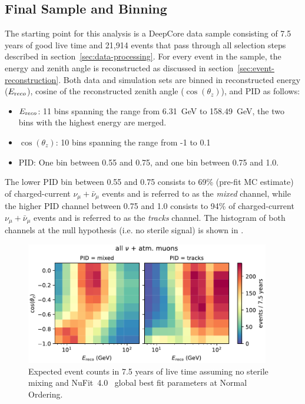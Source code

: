 \subsection{Final Sample and Binning}
\label{sec:sample-binning}
The starting point for this analysis is a DeepCore data sample consisting of 7.5 years of good live time and 21,914 events that pass through all selection steps described in section~\ref{sec:data-processing}. For every event in the sample, the energy and zenith angle is reconstructed as discussed in section~\ref{sec:event-reconstruction}. Both data and simulation sets are binned in reconstructed energy ($E_{\rm reco}$), cosine of the reconstructed zenith angle ($\cos(\theta_z)$), and PID as follows:

\begin{itemize}
    \item $E_{\rm reco}$: 11 bins spanning the range from 6.31~GeV to 158.49~GeV, the two bins with the highest energy are merged.
    \item $\cos(\theta_z)$: 10 bins spanning the range from -1 to 0.1
    \item PID: One bin between 0.55 and 0.75, and one bin between 0.75 and 1.0.
\end{itemize}

The lower PID bin between 0.55 and 0.75 consists to 69\%  (pre-fit MC estimate) of charged-current $\nu_\mu + \bar{\nu}_\mu$ events and is referred to as the \emph{mixed} channel, while the higher PID channel between 0.75 and 1.0 consists to 94\% of charged-current $\nu_\mu + \bar{\nu}_\mu$ events and is referred to as the \emph{tracks} channel. The histogram of both channels at the null hypothesis (i.e. no sterile signal) is shown in .

\begin{figure}
    \centering
    \includegraphics[width=0.95\textwidth]{figures/measurement/simulation_and_data/binning/plot_maps_total.pdf}
    \caption{Expected event counts in 7.5 years of live time assuming no sterile mixing and NuFit~4.0~\cite{nufit40} global best fit parameters at Normal Ordering.}
    \label{fig:nominal-hist-null-hypo}
\end{figure}

